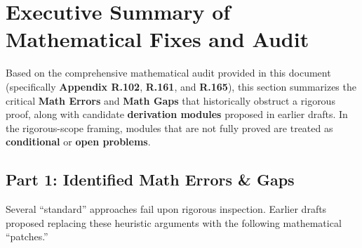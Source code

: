 \section{Executive Summary of Mathematical Fixes and Audit}
\label{sec:math_audit_summary}

Based on the comprehensive mathematical audit provided in this document (specifically \textbf{Appendix R.102}, \textbf{R.161}, and \textbf{R.165}), this section summarizes the critical \textbf{Math Errors} and \textbf{Math Gaps} that historically obstruct a rigorous proof, along with candidate \textbf{derivation modules} proposed in earlier drafts.
In the rigorous-scope framing, modules that are not fully proved are treated as \textbf{conditional} or \textbf{open problems}.

\subsection{Part 1: Identified Math Errors \& Gaps}

Several ``standard'' approaches fail upon rigorous inspection. Earlier drafts proposed replacing these heuristic arguments with the following mathematical ``patches.''

